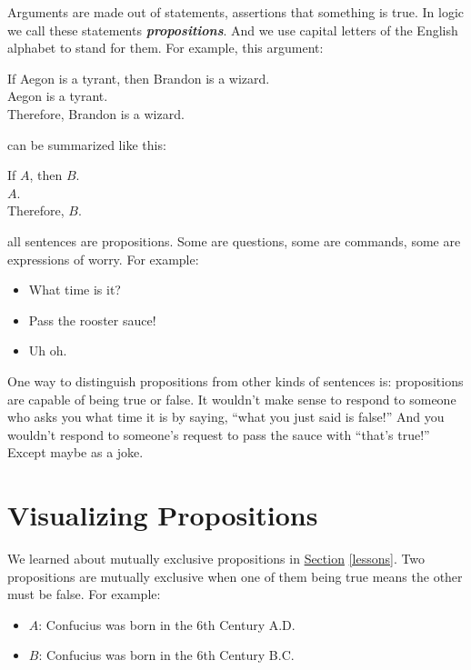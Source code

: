 \documentclass[justified]{tufte-book}
\providecommand{\tightlist}{%
  \setlength{\itemsep}{0pt}\setlength{\parskip}{0pt}}
\theoremstyle{definition}
\theoremstyle{definition}
\theoremstyle{definition}
\theoremstyle{definition}
\theoremstyle{remark}
\begin{document}
Arguments are made out of statements, assertions that something is true. In logic we call these statements \textbf{\emph{propositions}}. And we use capital letters of the English alphabet to stand for them. For example, this argument:

\begin{argument}
If Aegon is a tyrant, then Brandon is a wizard.\\
Aegon is a tyrant.\\
Therefore, Brandon is a wizard.
\end{argument}

can be summarized like this:

\begin{argument}
If \(A\), then \(B\).\\
\(A\).\\
Therefore, \(B\).
\end{argument}

 all sentences are propositions. Some are questions, some are commands, some are expressions of worry. For example:

\begin{itemize}
\tightlist
\item
  What time is it?
\item
  Pass the rooster sauce!
\item
  Uh oh.
\end{itemize}

One way to distinguish propositions from other kinds of sentences is: propositions are capable of being true or false. It wouldn't make sense to respond to someone who asks you what time it is by saying, ``what you just said is false!'' And you wouldn't respond to someone's request to pass the sauce with ``that's true!'' Except maybe as a joke.

\hypertarget{visualizing-propositions}{%
\section{Visualizing Propositions}\label{visualizing-propositions}}

We learned about mutually exclusive propositions in \protect\hyperlink{lessons}{Section} \ref{lessons}. Two propositions are mutually exclusive when one of them being true means the other must be false. For example:

\begin{itemize}
\tightlist
\item
  \(A\): Confucius was born in the 6th Century A.D.
\item
  \(B\): Confucius was born in the 6th Century B.C.
\end{itemize}
\end{document}
